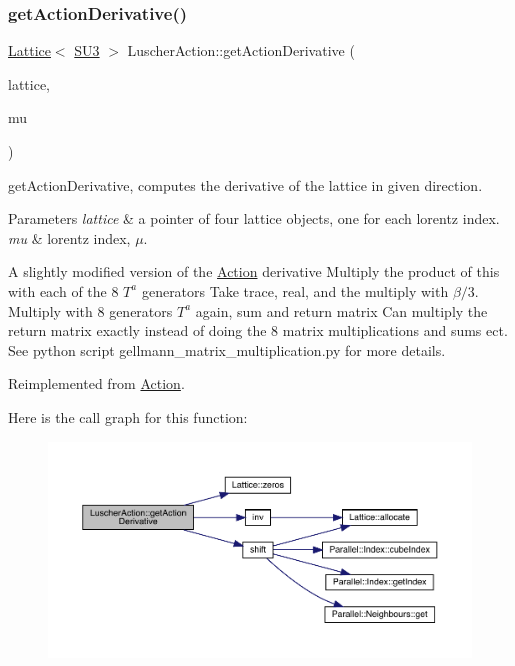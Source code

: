 \subsubsection{\texorpdfstring{getActionDerivative()}{getActionDerivative()}}
{\footnotesize\ttfamily \mbox{\hyperlink{class_lattice}{Lattice}}$<$ \mbox{\hyperlink{class_s_u3}{S\+U3}} $>$ Luscher\+Action\+::get\+Action\+Derivative (\begin{DoxyParamCaption}\item[{\mbox{\hyperlink{class_lattice}{Lattice}}$<$ \mbox{\hyperlink{class_s_u3}{S\+U3}} $>$ $\ast$}]{lattice,  }\item[{int}]{mu }\end{DoxyParamCaption})\hspace{0.3cm}{\ttfamily [virtual]}}



get\+Action\+Derivative, computes the derivative of the lattice in given direction. 


\begin{DoxyParams}{Parameters}
{\em lattice} & a pointer of four lattice objects, one for each lorentz index. \\
\hline
{\em mu} & lorentz index, $\mu$. \\
\hline
\end{DoxyParams}
A slightly modified version of the \mbox{\hyperlink{class_action}{Action}} derivative Multiply the product of this with each of the 8 $T^a$ generators Take trace, real, and the multiply with $\beta/3$. Multiply with 8 generators $T^a$ again, sum and return matrix Can multiply the return matrix exactly instead of doing the 8 matrix multiplications and sums ect. See python script gellmann\+\_\+matrix\+\_\+multiplication.\+py for more details.

Reimplemented from \mbox{\hyperlink{class_action_a78168dd7c3819a3365e28fc1aae1b9b6}{Action}}.

Here is the call graph for this function\+:\nopagebreak
\begin{figure}[H]
\begin{center}
\leavevmode
\includegraphics[width=350pt]{class_luscher_action_ac11785b2df276816a098a87e6ac514c7_cgraph}
\end{center}
\end{figure}
\mbox{\label{class_luscher_action_a1955f8eea8b0771f6c737c39e3fc11b2}} 
